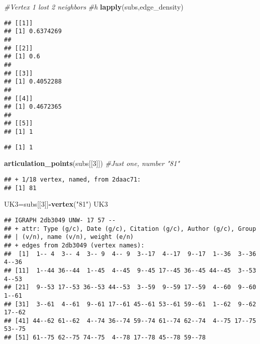 \documentclass[
]{article}
\newenvironment{Shaded}{\begin{snugshade}}{\end{snugshade}}
\newcommand{\CommentTok}[1]{\textcolor[rgb]{0.56,0.35,0.01}{\textit{#1}}}
\newcommand{\DecValTok}[1]{\textcolor[rgb]{0.00,0.00,0.81}{#1}}
\newcommand{\KeywordTok}[1]{\textcolor[rgb]{0.13,0.29,0.53}{\textbf{#1}}}
\newcommand{\NormalTok}[1]{#1}
\newcommand{\OperatorTok}[1]{\textcolor[rgb]{0.81,0.36,0.00}{\textbf{#1}}}
\newcommand{\StringTok}[1]{\textcolor[rgb]{0.31,0.60,0.02}{#1}}
\begin{document}
\begin{Shaded}
\begin{Highlighting}[]
\CommentTok{#Vertex 1 lost 2 neighbors}
\CommentTok{#h}
\KeywordTok{lapply}\NormalTok{(subs,edge_density)}
\end{Highlighting}
\end{Shaded}

\begin{verbatim}
## [[1]]
## [1] 0.6374269
## 
## [[2]]
## [1] 0.6
## 
## [[3]]
## [1] 0.4052288
## 
## [[4]]
## [1] 0.4672365
## 
## [[5]]
## [1] 1
\end{verbatim}

\begin{Shaded}
\end{Shaded}

\begin{verbatim}
## [1] 1
\end{verbatim}

\begin{Shaded}
\begin{Highlighting}[]
\KeywordTok{articulation_points}\NormalTok{(subs[[}\DecValTok{3}\NormalTok{]])  }\CommentTok{#Just one, number "81"}
\end{Highlighting}
\end{Shaded}

\begin{verbatim}
## + 1/18 vertex, named, from 2daac71:
## [1] 81
\end{verbatim}

\begin{Shaded}
\begin{Highlighting}[]
\NormalTok{UK3=subs[[}\DecValTok{3}\NormalTok{]]}\OperatorTok{-}\KeywordTok{vertex}\NormalTok{(}\StringTok{"81"}\NormalTok{)}
\NormalTok{UK3}
\end{Highlighting}
\end{Shaded}

\begin{verbatim}
## IGRAPH 2db3049 UNW- 17 57 -- 
## + attr: Type (g/c), Date (g/c), Citation (g/c), Author (g/c), Group
## | (v/n), name (v/n), weight (e/n)
## + edges from 2db3049 (vertex names):
##  [1]  1-- 4  3-- 4  3-- 9  4-- 9  3--17  4--17  9--17  1--36  3--36  4--36
## [11]  1--44 36--44  1--45  4--45  9--45 17--45 36--45 44--45  3--53  4--53
## [21]  9--53 17--53 36--53 44--53  3--59  9--59 17--59  4--60  9--60  1--61
## [31]  3--61  4--61  9--61 17--61 45--61 53--61 59--61  1--62  9--62 17--62
## [41] 44--62 61--62  4--74 36--74 59--74 61--74 62--74  4--75 17--75 53--75
## [51] 61--75 62--75 74--75  4--78 17--78 45--78 59--78
\end{verbatim}
\end{document}
